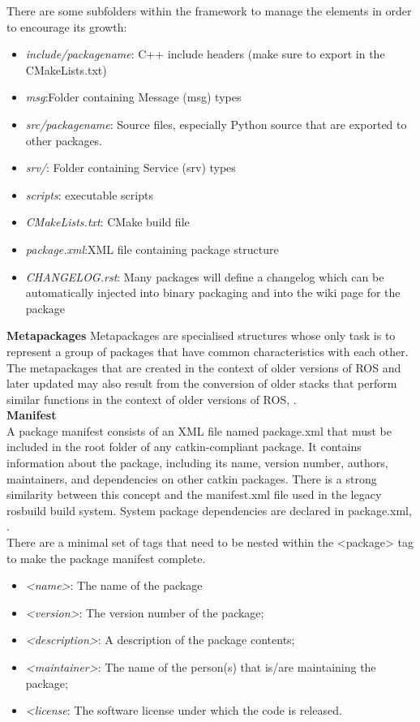 There are some subfolders within the framework to manage the elements in order to encourage its growth:
\begin{itemize}
    \item \textit{include/packagename}: C++ include headers (make sure to export in the CMakeLists.txt)
    \item \textit{msg}:Folder containing Message (msg) types
    \item \textit{src/packagename}: Source files, especially Python source that are exported to other packages.
    \item \textit{srv/}: Folder containing Service (srv) types
    \item \textit{scripts}: executable scripts
    \item \textit{CMakeLists.txt}: CMake build file
    \item \textit{package.xml}:XML file containing package structure 
    \item \textit{CHANGELOG.rst}: Many packages will define a changelog which can be automatically injected into binary packaging and into the wiki page for the package
\end{itemize}
\textbf{Metapackages}
Metapackages are specialised structures whose only task is to represent a group of packages that have common characteristics with each other. The metapackages that are created in the context of older versions of ROS and later updated may also result from the conversion of older stacks that perform similar functions in the context of older versions of ROS, \citet{rosmetapackages}.\\
\newline
\textbf{Manifest}\\
A package manifest consists of an XML file named package.xml that must be included in the root folder of any catkin-compliant package. It contains information about the package, including its name, version number, authors, maintainers, and dependencies on other catkin packages. There is a strong similarity between this concept and the manifest.xml file used in the legacy rosbuild build system. System package dependencies are declared in package.xml, \citet{rosmanifest}.\\
There are a minimal set of tags that need to be nested within the <package> tag to make the package manifest complete.
\begin{itemize}
    \item \textit{<name>}: The name of the package
    \item \textit{<version>}: The version number of the package;
    \item \textit{<description>}: A description of the package contents;
    \item \textit{<maintainer>}: The name of the person(s) that is/are maintaining the package;
    \item \textit{<license}: The software license under which the code is released.
\end{itemize}
